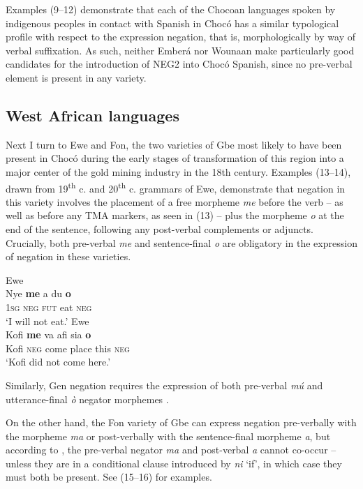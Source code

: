 \documentclass[output=paper,colorlinks,citecolor=brown]{langscibook}
\begin{document}
Examples (9–12) demonstrate that each of the Chocoan languages spoken by indigenous peoples in contact with Spanish in Chocó has a similar typological profile with respect to the expression negation, that is, morphologically by way of verbal suffixation. As such, neither Emberá nor Wounaan make particularly good candidates for the introduction of NEG2 into Chocó Spanish, since no pre-verbal element is present in any variety. 

\subsection{West African languages}

Next I turn to Ewe and Fon, the two varieties of Gbe most likely to have been present in Chocó during the early stages of transformation of this region into a major center of the gold mining industry in the 18th century. Examples (13–14), drawn from 19\textsuperscript{th} c. and 20\textsuperscript{th} c. grammars of Ewe, demonstrate that negation in this variety involves the placement of a free morpheme \emph{me} before the verb – as well as before any TMA markers, as seen in (13) – plus the morpheme \emph{o} at the end of the sentence, following any post-verbal complements or adjuncts. Crucially, both pre-verbal \emph{me} and sentence-final \emph{o} are obligatory in the expression of negation in these varieties.

\ea Ewe \citep[234]{Ellis_1890}\\   
\gll Nye \textbf{me} a du \textbf{o}\\
     \textsc{1sg} \textsc{neg} \textsc{fut} eat \textsc{neg}\\
\glt ‘I will not eat.’
\ex Ewe \citep[64]{Ameka_1991}\\
\gll Kofi \textbf{me} va afi sia \textbf{o}\\
     Kofi \textsc{neg} come place this \textsc{neg}\\
\glt ‘Kofi did not come here.’
\z

Similarly, Gen negation requires the expression of both pre-verbal \emph{mú} and utterance-final \emph{ò} negator morphemes \citep[46--47]{Aboh_2004}.

On the other hand, the Fon variety of Gbe can express negation pre-verbally with the morpheme \emph{ma} or post-verbally with the sentence-final morpheme \emph{a}, but according to \citet[45]{Aboh_2004}, the pre-verbal negator \emph{ma} and post-verbal \emph{a} cannot co-occur – unless they are in a conditional clause introduced by \emph{ni} ‘if’, in which case they must both be present. See (15–16) for examples.
\end{document}
